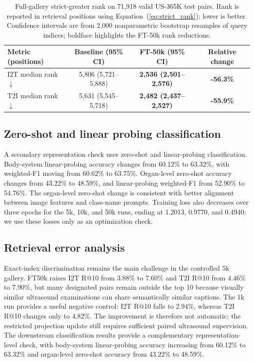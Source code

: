 \documentclass[runningheads]{llncs}
\begin{document}
\begin{table}[t]
\caption{Full-gallery strict-greater rank on 71,918 valid US-365K test pairs. Rank is reported in retrieval positions using Equation~(\ref{eq:strict_rank}); lower is better. Confidence intervals are from 2,000 nonparametric bootstrap resamples of query indices; boldface highlights the FT-50k rank reductions.}
\label{tab:fulltest_rank}
\centering
\scriptsize
\setlength{\tabcolsep}{5.0pt}
\begin{tabular}{@{}lccc@{}}
\toprule
\textbf{Metric (positions)} & \textbf{Baseline (95\% CI)} & \textbf{FT-50k (95\% CI)} & \textbf{Relative change} \\
\midrule
I2T median rank $\downarrow$ & 5,806 (5,721--5,888) & \textbf{2,536 (2,501--2,576)} & \textbf{-56.3\%} \\
T2I median rank $\downarrow$ & 5,631 (5,545--5,718) & \textbf{2,482 (2,437--2,527)} & \textbf{-55.9\%} \\
\bottomrule
\end{tabular}
\end{table}







\subsection{Zero-shot and linear probing classification}
A secondary representation check uses zero-shot and linear-probing classification. Body-system linear-probing accuracy changes from 60.12\% to 63.32\%, with weighted-F1 moving from 60.62\% to 63.75\%. Organ-level zero-shot accuracy changes from 43.22\% to 48.59\%, and linear-probing weighted-F1 from 52.90\% to 54.76\%. The organ-level zero-shot change is consistent with better alignment between image features and class-name prompts. Training loss also decreases over three epochs for the 5k, 10k, and 50k runs, ending at 1.2013, 0.9770, and 0.4940; we use these losses only as an optimization check.



\subsection{Retrieval error analysis}

Exact-index discrimination remains the main challenge in the controlled 5k gallery. FT50k raises I2T R@10 from 3.88\% to 7.60\% and T2I R@10 from 4.46\% to 7.90\%, but many designated pairs remain outside the top 10 because visually similar ultrasound examinations can share semantically similar captions. The 1k run provides a useful negative control: I2T R@10 falls to 2.94\%, whereas T2I R@10 changes only to 4.82\%. The improvement is therefore not automatic; the restricted projection update still requires sufficient paired ultrasound supervision. The downstream classification results provide a complementary representation-level check, with body-system linear-probing accuracy increasing from 60.12\% to 63.32\% and organ-level zero-shot accuracy from 43.22\% to 48.59\%.
\end{document}
